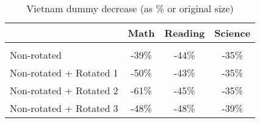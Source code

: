 \documentclass[10pt]{article}
\begin{document}
\begin{table}[htbp]

	\def\arraystretch{0.9}
  \centering
  \caption{Vietnam dummy decrease (as \% or original size)}
    \begin{tabular}{lccc}
    \toprule
    \midrule
          & \multicolumn{1}{c}{Math} & \multicolumn{1}{c}{Reading} & \multicolumn{1}{c}{Science} \\
    \hline \\
    Non-rotated & -39\% & -44\% & -35\% \\
    Non-rotated + Rotated 1 & -50\% & -43\% & -35\% \\
    Non-rotated + Rotated 2 & -61\% & -45\% & -35\% \\
    Non-rotated + Rotated 3 & -48\% & -48\% & -39\% \\
    \bottomrule
    \end{tabular}%
  \label{tab:addlabel}%
\end{table}%
\end{document}
